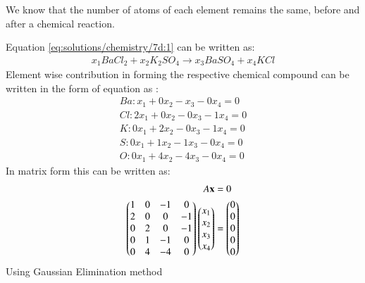We know that the number of atoms of each element remains the
same, before and after a chemical reaction.

Equation \eqref{eq:solutions/chemistry/7d:1} can be written as:
\begin{align}
x_1BaCl_2 + x_2K_2SO_4 \rightarrow x_3BaSO_4 + x_4KCl\label{eq:solutions/chemistry/7d:2}
\end{align}
Element wise contribution in forming the respective chemical compound can be written in the form of equation as :
\begin{align}
Ba : x_1 + 0x_2 - x_3 - 0x_4 = 0\\
Cl : 2x_1 + 0x_2 - 0x_3 - 1x_4 = 0\\
K  : 0x_1 + 2x_2 - 0x_3 - 1x_4 = 0\\
S  : 0x_1 + 1x_2 - 1x_3 - 0x_4 = 0\\
O  : 0x_1 + 4x_2 - 4x_3 - 0x_4 = 0
\end{align}
In matrix form this can be written as:
\begin{align}
A\mathbf{x}&=0\\
  \begin{pmatrix}1&0&-1&0\\2&0&0&-1\\0&2&0&-1\\0&1&-1&0\\0&4&-4&0\end{pmatrix}\begin{pmatrix}x_1\\x_2\\x_3\\x_4\end{pmatrix}&=\begin{pmatrix}0\\0\\0\\0\\0\end{pmatrix}
\end{align}
Using Gaussian Elimination method 
